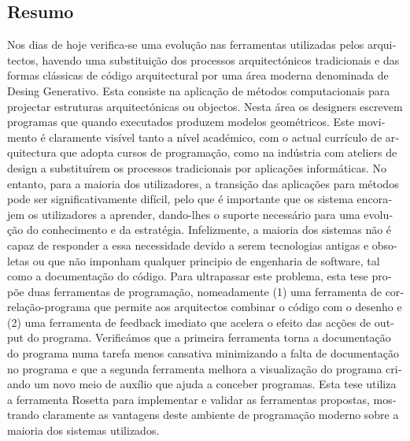 
\begin{otherlanguage}{portuguese}





\chapter*{Resumo}
\thispagestyle{empty}

Nos dias de hoje verifica-se uma evolução nas ferramentas utilizadas pelos arquitectos, havendo uma substituição dos processos arquitectónicos tradicionais e das formas clássicas de código arquitectural por uma área moderna denominada de Desing Generativo. Esta consiste na aplicação de métodos computacionais para projectar estruturas arquitectónicas ou objectos. Nesta área os designers escrevem programas que quando executados produzem modelos geométricos. Este movimento é claramente visível tanto a nível académico, com o actual currículo de arquitectura que adopta cursos de programação, como na indústria com ateliers de design a substituírem os processos tradicionais por aplicações informáticas. No entanto, para a maioria dos utilizadores, a transição das aplicações para métodos pode ser significativamente difícil, pelo que é importante que os sistema encorajem os utilizadores a aprender, dando-lhes o suporte necessário para uma evolução do conhecimento e da estratégia. Infelizmente, a maioria dos sistemas não é capaz de responder a essa necessidade devido a serem tecnologias antigas e obsoletas ou que não imponham qualquer  principio de engenharia de software, tal como a documentação do código. Para ultrapassar este problema, esta tese propõe duas ferramentas de programação, nomeadamente (1) uma ferramenta de correlação-programa que permite aos arquitectos combinar o código com o desenho e (2) uma ferramenta de feedback imediato que acelera o efeito das acções de output do programa. Verificámos que a primeira ferramenta torna a documentação do programa numa tarefa menos cansativa minimizando a falta de documentação no programa e que a segunda ferramenta melhora a visualização do programa criando um novo meio de auxílio que ajuda a conceber programas. Esta tese utiliza a ferramenta Rosetta para implementar e validar as ferramentas propostas, mostrando claramente as vantagens deste ambiente de programação moderno sobre a maioria dos sistemas utilizados.

\begin{flushleft}
\end{flushleft}

\end{otherlanguage}
